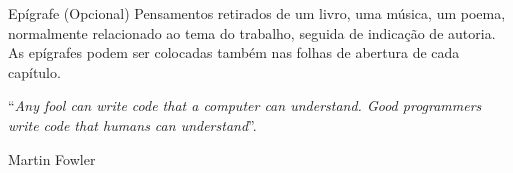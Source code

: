 \begin{epigrafe}
	
	\vspace*{\fill}
	Epígrafe (Opcional) 
    Pensamentos retirados de um livro, uma música, um poema, normalmente relacionado ao tema do trabalho, seguida de indicação de autoria. As epígrafes podem ser colocadas também nas folhas de abertura de cada capítulo.  
    
	\epigraph{``\emph{Any fool can write code that a computer can understand. Good programmers write code that humans can understand}''.}{Martin Fowler}
	
\end{epigrafe}